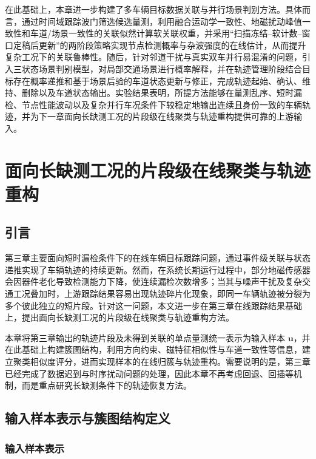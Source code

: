 \documentclass{xdupgthesis}
\begin{document}
在此基础上，本章进一步构建了多车辆目标数据关联与并行场景判别方法。具体而言，通过时间域跟踪波门筛选候选量测，利用融合运动学一致性、地磁扰动峰值一致性和车道/场景一致性的关联似然计算软关联权重，并采用“扫描冻结--软计数--窗口定稿后更新”的两阶段策略实现节点检测概率与杂波强度的在线估计，从而提升复杂工况下的关联鲁棒性。随后，针对邻道干扰与真实双车并行易混淆的问题，引入三状态场景判别模型，对局部交通场景进行概率解释，并在轨迹管理阶段结合目标存在概率递推和基于场景后验的车道状态更新与修正，完成轨迹起始、确认、维持、删除以及车道状态输出。实验结果表明，所提方法能够在量测乱序、短时漏检、节点性能波动以及复杂并行车况条件下较稳定地输出连续且身份一致的车辆轨迹，并为下一章面向长缺测工况的片段级在线聚类与轨迹重构提供可靠的上游输入。





\chapter{面向长缺测工况的片段级在线聚类与轨迹重构}
\label{chap:cedas_fragment}

\section{引言}

第三章主要面向短时漏检条件下的在线车辆目标跟踪问题，通过事件级关联与状态递推实现了车辆轨迹的持续更新。然而，在系统长期运行过程中，部分地磁传感器会因器件老化导致检测能力下降，使连续漏检次数增多；当其与噪声干扰及复杂交通工况叠加时，上游跟踪结果容易出现轨迹碎片化现象，即同一车辆轨迹被分裂为多个彼此独立的短片段。针对这一问题，本文进一步在第三章在线跟踪结果基础上，提出面向长缺测工况的片段级在线聚类与轨迹重构方法。

本章将第三章输出的轨迹片段及未得到关联的单点量测统一表示为输入样本 $\mathbf{u}$，并在此基础上构建簇图结构，利用方向约束、磁特征相似性与车道一致性等信息，建立聚类相似度评分，进而实现样本的在线归簇与轨迹重构。需要说明的是，第三章已经完成了数据迟到与时序扰动问题的处理，因此本章不再考虑回退、回插等机制，而是重点研究长缺测条件下的轨迹恢复方法。

\section{输入样本表示与簇图结构定义}

\subsection{输入样本表示}
\end{document}
